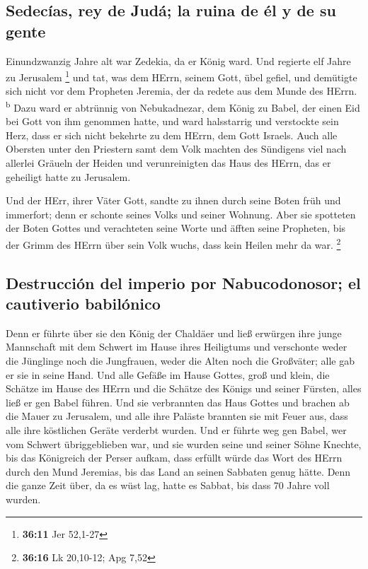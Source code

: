 \hypertarget{sedecuxedas-rey-de-juduxe1-la-ruina-de-uxe9l-y-de-su-gente}{%
\subsection{Sedecías, rey de Judá; la ruina de él y de su
gente}\label{sedecuxedas-rey-de-juduxe1-la-ruina-de-uxe9l-y-de-su-gente}}

 Einundzwanzig Jahre alt war Zedekia, da er König ward.
Und regierte elf Jahre zu Jerusalem \footnote{\textbf{36:11} Jer 52,1-27}
 und tat, was dem HErrn, seinem Gott, übel gefiel, und
demütigte sich nicht vor dem Propheten Jeremia, der da redete aus dem
Munde des HErrn. \textsuperscript{b}  Dazu ward er
abtrünnig von Nebukadnezar, dem König zu Babel, der einen Eid bei Gott
von ihm genommen hatte, und ward halsstarrig und verstockte sein Herz,
dass er sich nicht bekehrte zu dem HErrn, dem Gott Israels.
 Auch alle Obersten unter den Priestern samt dem Volk
machten des Sündigens viel nach allerlei Gräueln der Heiden und
verunreinigten das Haus des HErrn, das er geheiligt hatte zu Jerusalem.

 Und der HErr, ihrer Väter Gott, sandte zu ihnen durch
seine Boten früh und immerfort; denn er schonte seines Volks und seiner
Wohnung.  Aber sie spotteten der Boten Gottes und
verachteten seine Worte und äfften seine Propheten, bis der Grimm des
HErrn über sein Volk wuchs, dass kein Heilen mehr da war. \footnote{\textbf{36:16}
  Lk 20,10-12; Apg 7,52}

\hypertarget{destrucciuxf3n-del-imperio-por-nabucodonosor-el-cautiverio-babiluxf3nico}{%
\subsection{Destrucción del imperio por Nabucodonosor; el cautiverio
babilónico}\label{destrucciuxf3n-del-imperio-por-nabucodonosor-el-cautiverio-babiluxf3nico}}

 Denn er führte über sie den König der Chaldäer und ließ
erwürgen ihre junge Mannschaft mit dem Schwert im Hause ihres Heiligtums
und verschonte weder die Jünglinge noch die Jungfrauen, weder die Alten
noch die Großväter; alle gab er sie in seine Hand.  Und
alle Gefäße im Hause Gottes, groß und klein, die Schätze im Hause des
HErrn und die Schätze des Königs und seiner Fürsten, alles ließ er gen
Babel führen.  Und sie verbrannten das Haus Gottes und
brachen ab die Mauer zu Jerusalem, und alle ihre Paläste brannten sie
mit Feuer aus, dass alle ihre köstlichen Geräte verderbt wurden.
 Und er führte weg gen Babel, wer vom Schwert
übriggeblieben war, und sie wurden seine und seiner Söhne Knechte, bis
das Königreich der Perser aufkam,  dass erfüllt würde das
Wort des HErrn durch den Mund Jeremias, bis das Land an seinen Sabbaten
genug hätte. Denn die ganze Zeit über, da es wüst lag, hatte es Sabbat,
bis dass 70 Jahre voll wurden.

